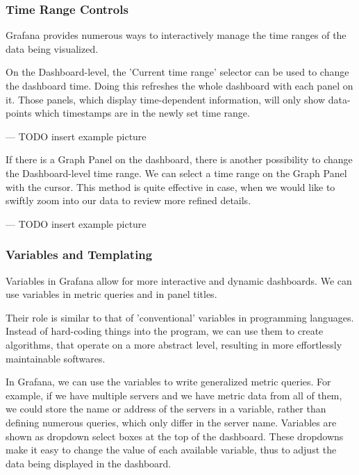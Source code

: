 \subsubsection{Time Range Controls}

Grafana provides numerous ways to interactively manage the time ranges of the data being visualized.

On the Dashboard-level, the 'Current time range' selector can be used to change the dashboard time. Doing this refreshes the whole dashboard with each panel on it. Those panels, which display time-dependent information, will only show data-points which timestamps are in the newly set time range.

\begin{center}
	--- TODO insert example picture
\end{center}

If there is a Graph Panel on the dashboard, there is another possibility to change the Dashboard-level time range. We can select a time range on the Graph Panel with the cursor. This method is quite effective in case, when we would like to swiftly zoom into our data to review more refined details.

\begin{center}
	--- TODO insert example picture
\end{center}

\subsubsection{Variables and Templating}

Variables in Grafana allow for more interactive and dynamic dashboards. We can use variables in metric queries and in panel titles.

Their role is similar to that of 'conventional' variables in programming languages. Instead of hard-coding things into the program, we can use them to create algorithms, that operate on a more abstract level, resulting in more effortlessly maintainable softwares.

In Grafana, we can use the variables to write generalized metric queries. For example, if we have multiple servers and we have metric data from all of them, we could store the name or address of the servers in a variable, rather than defining numerous queries, which only differ in the server name. Variables are shown as dropdown select boxes at the top of the dashboard. These dropdowns make it easy to change the value of each available variable, thus to adjust the data being displayed in the dashboard.

